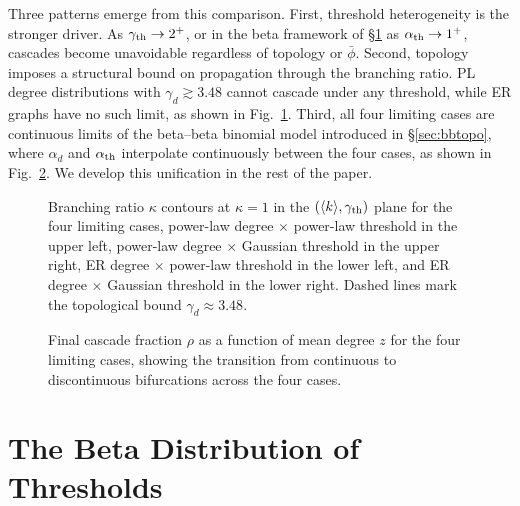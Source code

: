 \documentclass[]{revtex4-2}
\begin{document}
Three patterns emerge from this comparison. First, threshold heterogeneity is the stronger driver. As $\gamma_{\rm th}\to2^+$, or in the beta framework of \S\ref{sec:betath} as $\alpha_{\rm th}\to1^+$, cascades become unavoidable regardless of topology or $\bar\phi$. Second, topology imposes a structural bound on propagation through the branching ratio. PL degree distributions with $\gamma_d\gtrsim3.48$ cannot cascade under any threshold, while ER graphs have no such limit, as shown in Fig.~\ref{fig:four-cases-kappa}. Third, all four limiting cases are continuous limits of the beta--beta binomial model introduced in \S\ref{sec:bbtopo}, where $\alpha_d$ and $\alpha_{\rm th}$ interpolate continuously between the four cases, as shown in Fig.~\ref{fig:four-cases-rho}. We develop this unification in the rest of the paper.

\begin{figure}[t]
\centering
{}
\caption{Branching ratio $\kappa$ contours at $\kappa=1$ in the $(\langle k\rangle,\gamma_{\rm th})$ plane for the four limiting cases, power-law degree $\times$ power-law threshold in the upper left, power-law degree $\times$ Gaussian threshold in the upper right, ER degree $\times$ power-law threshold in the lower left, and ER degree $\times$ Gaussian threshold in the lower right. Dashed lines mark the topological bound $\gamma_d\approx3.48$.}
\label{fig:four-cases-kappa}
\end{figure}

\begin{figure}[t]
\centering
{}
\caption{Final cascade fraction $\rho$ as a function of mean degree $z$ for the four limiting cases, showing the transition from continuous to discontinuous bifurcations across the four cases.}
\label{fig:four-cases-rho}
\end{figure}
\section{The Beta Distribution of Thresholds}
\label{sec:betath}
\end{document}
